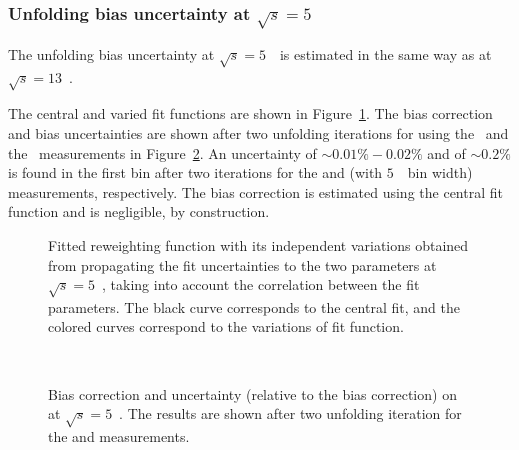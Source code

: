 \subsubsection{Unfolding bias uncertainty at $\sqrt{s} = 5$~\TeV}
The unfolding bias uncertainty at $\sqrt{s} = 5$~\TeV\ is estimated in the same way as at $\sqrt{s} = 13$~\TeV.

The central and varied fit functions are shown in Figure~\ref{fig:fits_5_1GeV}.
The bias correction and bias uncertainties are shown after two unfolding iterations for \ptz using the \ptdilep\ and the \ut\ measurements in Figure~\ref{fig:biasunc_5}.
An uncertainty of $\sim 0.01\% -0.02\%$ and of $\sim 0.2\% $ is found in the first bin after two iterations for the \ptdilep and \ut (with $5$~\GeV\ bin width) measurements, respectively.
The bias correction is estimated using the central fit function and is negligible, by construction.

\begin{figure}[h]
\centering
{}
\caption{Fitted reweighting function with its independent variations obtained from propagating the fit uncertainties to the two parameters at $\sqrt{s} = 5$~\TeV, taking into account the correlation between the fit parameters. The black curve corresponds to the central fit, and the colored curves correspond to the variations of fit function.}
\label{fig:fits_5_1GeV}
\end{figure}

\begin{figure}[h]
\centering
{}
\\
\caption{Bias correction and uncertainty (relative to the bias correction) on \ptz at $\sqrt{s} = 5$~\TeV. The results are shown after two unfolding iteration for the \ptdilep and  \ut measurements. }
\label{fig:biasunc_5}
\end{figure}


